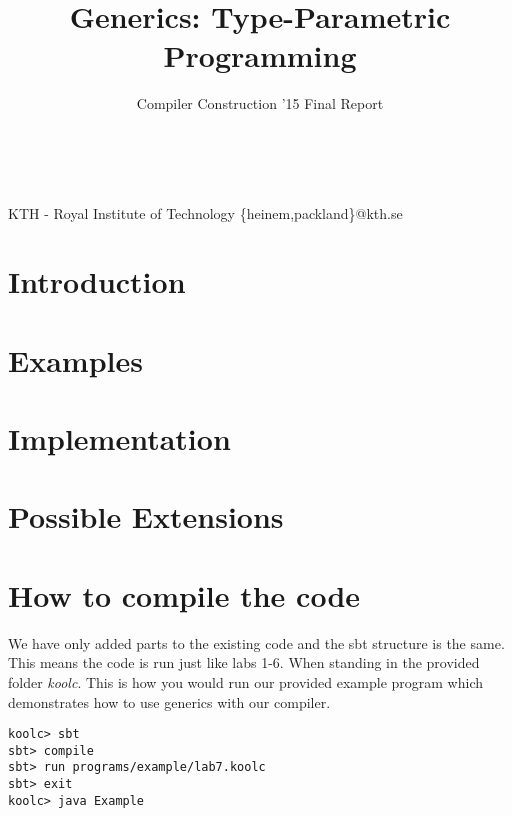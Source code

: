 \documentclass[nocopyrightspace,11pt,authoryear,preprint]{sigplanconf}
\begin{document}
\\


\title{Generics: Type-Parametric Programming}
\subtitle{Compiler Construction '15 Final Report}

           {KTH - Royal Institute of Technology}
           {\{heinem,packland\}@kth.se}

\maketitle

\section{Introduction}


\section{Examples}


\section{Implementation}


\section{Possible Extensions}


\section{How to compile the code}
We have only added parts to the existing code and the sbt structure is the same. This means the code is run just like labs 1-6. When standing in the provided folder \emph{koolc}. This is how you would run our provided example program which demonstrates how to use generics with our compiler.

\begin{lstlisting}
koolc> sbt
sbt> compile
sbt> run programs/example/lab7.koolc
sbt> exit
koolc> java Example
\end{lstlisting}



\end{document}
